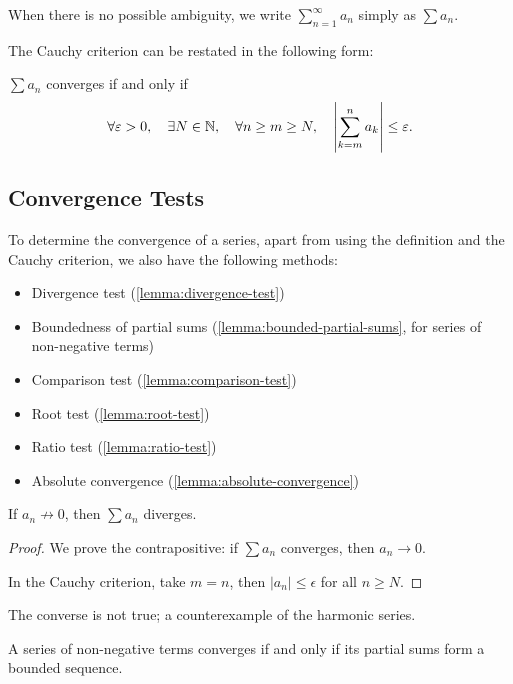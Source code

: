 \begin{notation}
When there is no possible ambiguity, we write $\displaystyle\sum_{n=1}^{\infty}a_n$ simply as $\sum a_n$.
\end{notation}

The Cauchy criterion can be restated in the following form:

\begin{proposition}
$\sum a_n$ converges if and only if
\[\forall\varepsilon>0,\quad\exists N\in\mathbb N,\quad\forall n\ge m\ge N,\quad\left|\sum_{k=m}^n a_k\right|\le\varepsilon.\]
\end{proposition}
\pagebreak

\subsection{Convergence Tests}
To determine the convergence of a series, apart from using the definition and the Cauchy criterion, we also have the following methods:
\begin{itemize}
\item Divergence test (\cref{lemma:divergence-test})
\item Boundedness of partial sums (\cref{lemma:bounded-partial-sums}, for series of non-negative terms)
\item Comparison test (\cref{lemma:comparison-test})
\item Root test (\cref{lemma:root-test})
\item Ratio test (\cref{lemma:ratio-test})
\item Absolute convergence (\cref{lemma:absolute-convergence})
\end{itemize}

\begin{lemma}\label{lemma:divergence-test}
If $a_n\not\to0$, then $\sum a_n$ diverges.
\end{lemma}

\begin{proof}
We prove the contrapositive: if $\sum a_n$ converges, then $a_n\to0$.

In the Cauchy criterion, take $m=n$, then $|a_n|\le\epsilon$ for all $n\ge N$.
\end{proof}

\begin{remark}
The converse is not true; a counterexample of the harmonic series.
\end{remark}

\begin{lemma}\label{lemma:bounded-partial-sums}
A series of non-negative terms converges if and only if its partial sums form a bounded sequence.
\end{lemma}


